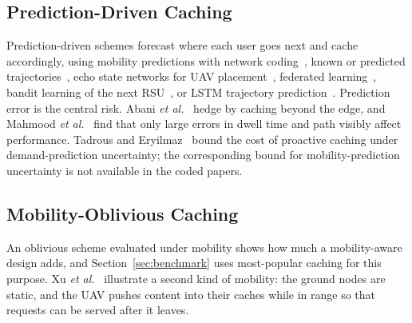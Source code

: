 \subsection{Prediction-Driven Caching}
\label{subsec:prediction}

Prediction-driven schemes forecast where each user goes next and cache accordingly, using mobility predictions with network coding~\cite{poularakis2017code}, known or predicted trajectories~\cite{guan2014mobicacher}, echo state networks for UAV placement~\cite{chen2017sky}, federated learning~\cite{yu2021mobility}, bandit learning of the next RSU~\cite{wangq2022proactive}, or LSTM trajectory prediction~\cite{choi2023deep}. Prediction error is the central risk. Abani \emph{et al.}~\cite{abani2017proactive} hedge by caching beyond the edge, and Mahmood \emph{et al.}~\cite{mahmood2019rich} find that only large errors in dwell time and path visibly affect performance. Tadrous and Eryilmaz~\cite{tadrous2016optimal} bound the cost of proactive caching under demand-prediction uncertainty; the corresponding bound for mobility-prediction uncertainty is not available in the coded papers.

\subsection{Mobility-Oblivious Caching}
\label{subsec:oblivious}

An oblivious scheme evaluated under mobility shows how much a mobility-aware design adds, and Section~\ref{sec:benchmark} uses most-popular caching for this purpose. Xu \emph{et al.}~\cite{xu2018overcoming} illustrate a second kind of mobility: the ground nodes are static, and the UAV pushes content into their caches while in range so that requests can be served after it leaves.
